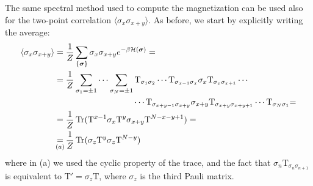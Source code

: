 \documentclass[12pt,a4paper]{report}
\begin{document}
\begin{enumerate}
        The same spectral method used to compute the magnetization can be used also for the two-point correlation $\langle \sigma_x \sigma_{x+y} \rangle$. As before, we start by explicitly writing the average:
        \begin{align*}
            \langle \sigma_x \sigma_{x+y} \rangle &= \frac{1}{Z} \sum_{\{\bm{\sigma}\}}  \sigma_x \sigma_{x+y} e^{-\beta \mathcal{H}(\bm{\sigma})} =  \\
            &= \frac{1}{Z} \sum_{\sigma_1 = \pm 1} \cdots \sum_{\sigma_N = \pm 1} \mathrm{T}_{\sigma_1 \sigma_2} \cdots \mathrm{T}_{\sigma_{x-1} \sigma_x}\sigma_x \mathrm{T}_{\sigma_x \sigma_{x+1}} \cdots \\
            &\qquad\qquad\qquad\qquad\quad \> \cdots \mathrm{T}_{\sigma_{x+y-1} \sigma_{x+y}} \sigma_{x+y} \mathrm{T}_{\sigma_{x+y} \sigma_{x+y+1}} \cdots \mathrm{T}_{\sigma_{N} \sigma_1} \span =\\
            &= \frac{1}{Z} \operatorname{Tr} (\mathrm{T}^{x-1} \sigma_x \mathrm{T}^y \sigma_{x+y} \mathrm{T}^{N-x-y+1}) =\\
            &\underset{\mathclap{(a)}}{=}  \frac{1}{Z} \operatorname{Tr}(\sigma_z \mathrm{T}^y \sigma_z \mathrm{T}^{N-y}) 
        \end{align*}
        where in (a) we used the cyclic property of the trace, and the fact that $\sigma_n \mathrm{T}_{\sigma_n \sigma_{n+1}}$ is equivalent to $\mathrm{T}' = \sigma_z \mathrm{T}$, where $\sigma_z$ is the third Pauli matrix.

        \medskip


\end{enumerate}
\end{document}
